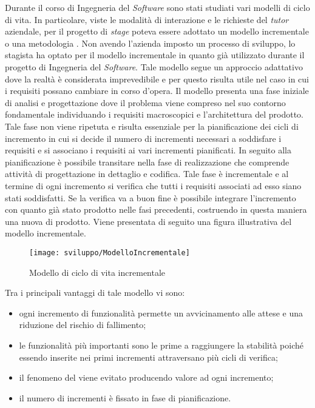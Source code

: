 Durante il corso di Ingegneria del \textit{Software} sono stati studiati vari modelli di ciclo di vita. In particolare, viste le modalità di interazione e le richieste del \textit{tutor} aziendale, per il progetto di \textit{stage} poteva essere adottato un modello incrementale o una metodologia . Non avendo l'azienda imposto un processo di sviluppo, lo stagista ha optato per il modello incrementale in quanto già utilizzato durante il progetto di Ingegneria del \textit{Software}. Tale modello segue un approccio adattativo dove la realtà è considerata imprevedibile e per questo risulta utile nel caso in cui i requisiti possano cambiare in corso d'opera. Il modello presenta una fase iniziale di analisi e progettazione dove il problema viene compreso nel suo contorno fondamentale individuando i requisiti macroscopici e l'architettura del prodotto. Tale fase non viene ripetuta e risulta essenziale per la pianificazione dei cicli di incremento in cui si decide il numero di incrementi necessari a soddisfare i requisiti e si associano i requisiti ai vari incrementi pianificati. In seguito alla pianificazione è possibile transitare nella fase di realizzazione che comprende attività di progettazione in dettaglio e codifica. Tale fase è incrementale e al termine di ogni incremento si verifica che tutti i requisiti associati ad esso siano stati soddisfatti. Se la verifica va a buon fine è possibile integrare l'incremento con quanto già stato prodotto nelle fasi precedenti, costruendo in questa maniera una nuova  di prodotto. Viene presentata di seguito una figura illustrativa del modello incrementale.

\begin{figure}[!h] 
    \centering 
    \texttt{[image: sviluppo/ModelloIncrementale]} 
    \caption{Modello di ciclo di vita incrementale}
\end{figure}

Tra i principali vantaggi di tale modello vi sono:
\begin{itemize}
	\item ogni incremento di funzionalità permette un avvicinamento alle attese e una riduzione del rischio di fallimento;
	\item le funzionalità più importanti sono le prime a raggiungere la stabilità poiché essendo inserite nei primi incrementi attraversano più cicli di verifica;
	\item il fenomeno del  viene evitato producendo valore ad ogni incremento;
	\item il numero di incrementi è fissato in fase di pianificazione.
\end{itemize}


